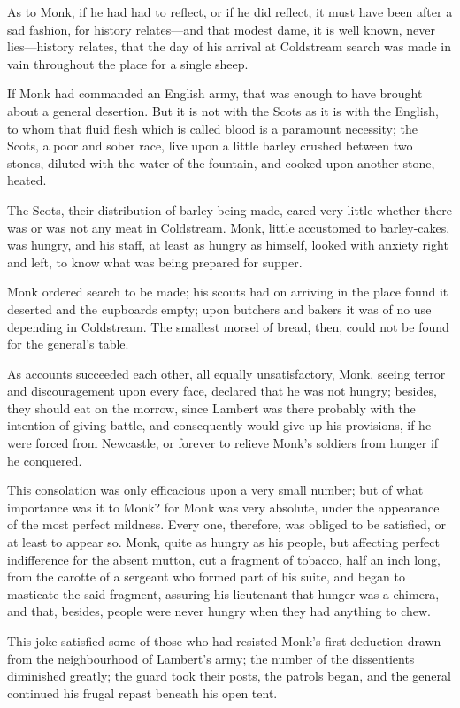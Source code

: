 As to Monk, if he had had to reflect, or if he did reflect, it must have been after a sad fashion, for history relates—and that modest dame, it is well known, never lies—history relates, that the day of his arrival at Coldstream search was made in vain throughout the place for a single sheep.

If Monk had commanded an English army, that was enough to have brought about a general desertion. But it is not with the Scots as it is with the English, to whom that fluid flesh which is called blood is a paramount necessity; the Scots, a poor and sober race, live upon a little barley crushed between two stones, diluted with the water of the fountain, and cooked upon another stone, heated.

The Scots, their distribution of barley being made, cared very little whether there was or was not any meat in Coldstream. Monk, little accustomed to barley-cakes, was hungry, and his staff, at least as hungry as himself, looked with anxiety right and left, to know what was being prepared for supper.

Monk ordered search to be made; his scouts had on arriving in the place found it deserted and the cupboards empty; upon butchers and bakers it was of no use depending in Coldstream. The smallest morsel of bread, then, could not be found for the general's table.

As accounts succeeded each other, all equally unsatisfactory, Monk, seeing terror and discouragement upon every face, declared that he was not hungry; besides, they should eat on the morrow, since Lambert was there probably with the intention of giving battle, and consequently would give up his provisions, if he were forced from Newcastle, or forever to relieve Monk's soldiers from hunger if he conquered.

This consolation was only efficacious upon a very small number; but of what importance was it to Monk? for Monk was very absolute, under the appearance of the most perfect mildness. Every one, therefore, was obliged to be satisfied, or at least to appear so. Monk, quite as hungry as his people, but affecting perfect indifference for the absent mutton, cut a fragment of tobacco, half an inch long, from the carotte of a sergeant who formed part of his suite, and began to masticate the said fragment, assuring his lieutenant that hunger was a chimera, and that, besides, people were never hungry when they had anything to chew.

This joke satisfied some of those who had resisted Monk's first deduction drawn from the neighbourhood of Lambert's army; the number of the dissentients diminished greatly; the guard took their posts, the patrols began, and the general continued his frugal repast beneath his open tent.

